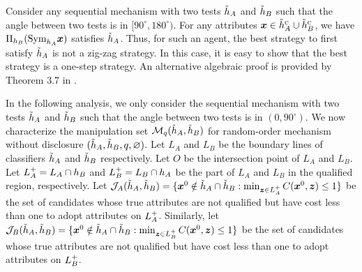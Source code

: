 \begin{remark}
    Consider any sequential mechanism with two tests $\tilde {h}_A$ and $\tilde {h}_B$ such that the angle between two tests is in $[90^{\circ}, 180^{\circ})$.
    For any attributes $\boldsymbol{x} \in \tilde {h}_A^{\textsc{c}} \cup \tilde {h}_B^{\textsc{c}}$, we have  $\Pi_{h_B}(\boldsymbol{\text{Sym}}_{h_A}\boldsymbol{x})$ satisfies $\tilde{h}_A$. Thus, for such an agent, the best strategy to first satisfy $\tilde{h}_A$ is not a zig-zag strategy. In this case, it is easy to show that the best strategy is a one-step strategy. An alternative algebraic proof is provided by Theorem 3.7 in \citet{zigzag}.
\end{remark}

In the following analysis, we only consider the sequential mechanism with two tests $\tilde {h}_A$ and $\tilde {h}_B$ such that the angle between two tests is in $(0,90^{\circ})$.
We now characterize the manipulation set $\mathcal{M}_{q}(\tilde{h}_A,\tilde{h}_B)$ for random-order mechanism without disclosure $(\tilde{h}_A, \tilde{h}_B,q,\varnothing)$.
Let $L_A$ and $L_B$ be the boundary lines of classifiers $\tilde {h}_A$ and $\tilde {h}_B$ respectively. 
Let $O$ be the intersection point of $L_A$ and $L_B$.
Let $L_A^+=L_A\cap h_B$  and $L_B^+=L_B\cap h_A$ be the part of $L_A$ and $L_B$ in the qualified region, respectively.
Let $\mathcal{J}_A(\tilde {h}_A, \tilde {h}_B)=\{\boldsymbol{x}^0\notin \tilde{h}_A\cap \tilde{h}_B: \min_{\boldsymbol{z}\in L_A^+}C(\boldsymbol{x}^0,\boldsymbol{z})\leq 1 \}$ be the set of candidates whose true attributes are not qualified but have cost less than one to adopt attributes on $L_A^+$.
Similarly, let $\mathcal{J}_B(\tilde {h}_A, \tilde {h}_B)=\{\boldsymbol{x}^0\notin \tilde {h}_A\cap \tilde {h}_B: \min_{\boldsymbol{z}\in L_B^+}C(\boldsymbol{x}^0,\boldsymbol{z})\leq 1 \}$ be the set of candidates whose true attributes are not qualified but have cost less than one to adopt attributes on $L_B^+$.

